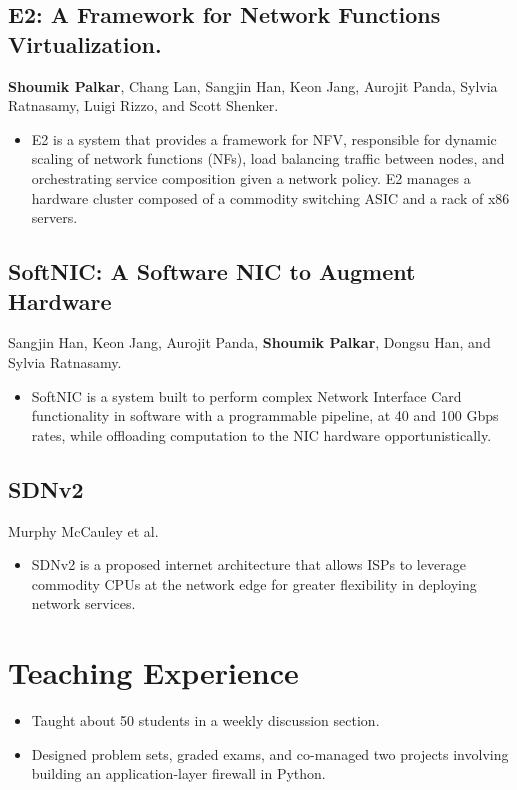 \documentclass[11pt,letterpaper,sans]{moderncv}
\begin{document}
\subsection{E2: A Framework for Network Functions Virtualization.}
\cvitem {}
{
    \textbf{Shoumik Palkar}, Chang Lan, Sangjin Han, Keon Jang, Aurojit Panda, Sylvia Ratnasamy,
    Luigi Rizzo, and Scott Shenker.
    \begin{itemize}
        \item E2 is a system that provides a framework for NFV, responsible for dynamic scaling
        of network functions (NFs), load balancing traffic between nodes, and orchestrating
        service composition given a network policy. E2 manages a hardware cluster composed of a
        commodity switching ASIC and a rack of x86 servers.
    \end{itemize}
}

\subsection{SoftNIC: A Software NIC to Augment Hardware}
\cvitem{}
{
    Sangjin Han, Keon Jang, Aurojit Panda, \textbf{Shoumik Palkar}, Dongsu Han, and Sylvia Ratnasamy.
    \begin{itemize}
        \item SoftNIC is a system built to perform complex Network Interface Card functionality in
        software with a programmable pipeline, at 40 and 100 Gbps rates, while offloading
        computation to the NIC hardware opportunistically.
    \end{itemize}
}

\subsection{SDNv2}
\cvitem{} 
{
    Murphy McCauley et al.
    \begin{itemize}
        \item SDNv2 is a proposed internet architecture that allows ISPs to leverage commodity CPUs
        at the network edge for greater flexibility in deploying network services.
    \end{itemize}
}

\section{Teaching Experience}
 {
\begin{itemize}
\item Taught about 50 students in a weekly discussion section.
\item Designed problem sets, graded exams, and co-managed two projects involving
building an application-layer firewall in Python.
\end{itemize}
}
\end{document}
